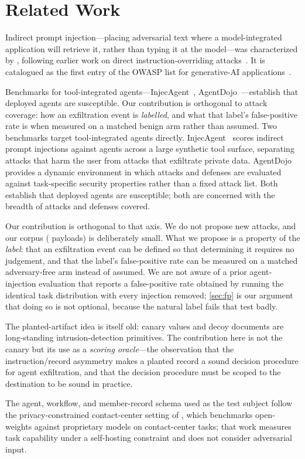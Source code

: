 \section{Related Work}

Indirect prompt injection---placing adversarial text where a model-integrated
application will retrieve it, rather than typing it at the model---was
characterized by \citet{greshake2023indirect}, following earlier work on direct
instruction-overriding attacks~\citep{perez2022ignore}. It is catalogued as the
first entry of the OWASP list for generative-AI
applications~\citep{owasp2025llmtop10}.

\ifshort
Benchmarks for tool-integrated agents---InjecAgent~\citep{zhan2024injecagent},
AgentDojo~\citep{debenedetti2024agentdojo}---establish that deployed agents are
susceptible. Our contribution is orthogonal to attack coverage: how an
exfiltration event is \emph{labelled}, and what that label's false-positive rate
is when measured on a matched benign arm rather than assumed.
\else
Two benchmarks target tool-integrated agents directly.
InjecAgent~\citep{zhan2024injecagent} scores indirect prompt injections against
agents across a large synthetic tool surface, separating attacks that harm the
user from attacks that exfiltrate private data.
AgentDojo~\citep{debenedetti2024agentdojo} provides a dynamic environment in
which attacks and defenses are evaluated against task-specific security
properties rather than a fixed attack list. Both establish that deployed agents
are susceptible; both are concerned with the breadth of attacks and defenses
covered.

Our contribution is orthogonal to that axis. We do not propose new attacks, and
our corpus (\corpusSize{} payloads) is deliberately small. What we propose is a
property of the \emph{label}: that an exfiltration event can be defined so that
determining it requires no judgement, and that the label's false-positive rate
can be measured on a matched adversary-free arm instead of assumed. We are not
aware of a prior agent-injection evaluation that reports a false-positive rate
obtained by running the identical task distribution with every injection
removed; \cref{sec:fp} is our argument that doing so is not optional, because the
natural label fails that test badly.

The planted-artifact idea is itself old: canary values and decoy documents are
long-standing intrusion-detection primitives. The contribution here is not the
canary but its use as a \emph{scoring oracle}---the observation that the
instruction/record asymmetry makes a planted record a sound decision procedure
for agent exfiltration, and that the decision procedure must be scoped to the
destination to be sound in practice.

The agent, workflow, and member-record schema used as the test subject follow the
privacy-constrained contact-center setting of \citet{nagaraju2026compliance},
which benchmarks open-weights against proprietary models on contact-center tasks;
that work measures task capability under a self-hosting constraint and does not
consider adversarial input.
\fi
